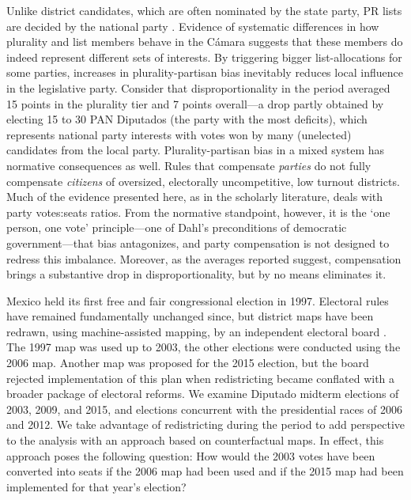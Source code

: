 \documentclass[letter,12pt]{article}
\begin{document}
Unlike district candidates, which are often nominated by the state party, PR lists are decided by the national party \citep{poire.phd.2002}. Evidence of systematic differences in how plurality and list members behave in the Cámara \citep{kerevelPork2015} suggests that these members do indeed represent different sets of interests. By triggering bigger list-allocations for some parties, increases in plurality-partisan bias inevitably reduces local influence in the legislative party. Consider that disproportionality \citep{gallagherDisproportionality1991} in the period averaged 15 points in the plurality tier and 7 points overall---a drop partly obtained by electing 15 to 30 PAN Diputados (the party with the most deficits), which represents national party interests with votes won by many (unelected) candidates from the local party. Plurality-partisan bias in a mixed system has normative consequences as well. Rules that compensate \emph{parties} do not fully compensate \emph{citizens} of oversized, electorally uncompetitive, low turnout districts. Much of the evidence presented here, as in the scholarly literature, deals with party votes:seats ratios. From the normative standpoint, however, it is the `one person, one vote' principle---one of Dahl's \citeyearpar{dahl.1972} preconditions of democratic government---that bias antagonizes, and party compensation is not designed to redress this imbalance. Moreover, as the averages reported suggest, compensation brings a substantive drop in disproportionality, but by no means eliminates it. 

Mexico held its first free and fair congressional election in 1997. Electoral rules have remained fundamentally unchanged since, but district maps have been redrawn, using machine-assisted mapping, by an independent electoral board \citep{lujambio.vives.2008,trelles.mtz.polygob2012}. The 1997 map was used up to 2003, the other elections were conducted using the 2006 map. Another map was proposed for the 2015 election, but the board rejected implementation of this plan when redistricting became conflated with a broader package of electoral reforms. We examine Diputado midterm elections of 2003, 2009, and 2015, and elections concurrent with the presidential races of 2006 and 2012. We take advantage of redistricting during the period to add perspective to the analysis with an approach based on counterfactual maps. In effect, this approach poses the following question: How would the 2003 votes have been converted into seats if the 2006 map had been used and if the 2015 map had been implemented for that year's election? 
\end{document}
